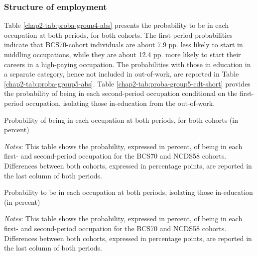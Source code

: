 \subsubsection{Structure of employment}\label{chap2-app-data-structure}

Table \ref{chap2-tab:proba-group4-abs} presents the probability to be in each occupation at both periods, for both cohorts. The first-period probabilities indicate that BCS70-cohort individuals are about 7.9 pp. less likely to start in middling occupations, while they are about 12.4 pp. more likely to start their careers in a high-paying occupation. The probabilities with those in education in a separate category, hence not included in out-of-work, are reported in Table \ref{chap2-tab:proba-group5-abs}. Table \ref{chap2-tab:proba-group5-cdt-short} provides the probability of being in each second-period occupation conditional on the first-period occupation, isolating those in-education from the out-of-work. 

\begin{table}[!htb]
    \centering
    \caption{Probability of being in each occupation at both periods, for both cohorts (in percent)}
    \label{chap2-tab:proba-group4-abs}
    \begin{threeparttable}
        \setlength{\tabcolsep}{10pt}
        
        \begin{tablenotes}[flushleft]
            \footnotesize{\item \textit{Notes}: This table shows the probability, expressed in percent, of being in each first- and second-period occupation for the BCS70 and NCDS58 cohorts. Differences between both cohorts, expressed in percentage points, are reported in the last column of both periods.}
        \end{tablenotes}
    \end{threeparttable}
\end{table}

\begin{table}[!htb]
     \centering
     \caption{Probability to be in each occupation at both periods, isolating those in-education (in percent)}
     \label{chap2-tab:proba-group5-abs}
    \begin{threeparttable}
        \setlength{\tabcolsep}{10pt}
        
        \begin{tablenotes}[flushleft]
            \footnotesize{\item \textit{Notes}: This table shows the probability, expressed in percent, of being in each first- and second-period occupation for the BCS70 and NCDS58 cohorts. Differences between both cohorts, expressed in percentage points, are reported in the last column of both periods.}
        \end{tablenotes}
    \end{threeparttable}
\end{table}

